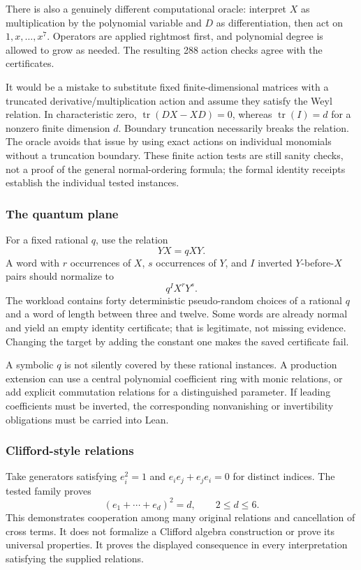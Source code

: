 There is also a genuinely different computational oracle: interpret \(X\) as multiplication by the polynomial variable and \(D\) as differentiation, then act on \(1,x,\ldots,x^7\). Operators are applied rightmost first, and polynomial degree is allowed to grow as needed. The resulting 288 action checks agree with the certificates.

It would be a mistake to substitute fixed finite-dimensional matrices with a truncated derivative/multiplication action and assume they satisfy the Weyl relation. In characteristic zero, \(\operatorname{tr}(DX-XD)=0\), whereas \(\operatorname{tr}(I)=d\) for a nonzero finite dimension \(d\). Boundary truncation necessarily breaks the relation. The oracle avoids that issue by using exact actions on individual monomials without a truncation boundary. These finite action tests are still sanity checks, not a proof of the general normal-ordering formula; the formal identity receipts establish the individual tested instances.

\subsubsection{The quantum plane}
For a fixed rational \(q\), use the relation
\[
 YX=qXY.
\]
A word with \(r\) occurrences of \(X\), \(s\) occurrences of \(Y\), and \(I\) inverted \(Y\)-before-\(X\) pairs should normalize to
\[
 q^I X^rY^s.
\]
The workload contains forty deterministic pseudo-random choices of a rational \(q\) and a word of length between three and twelve. Some words are already normal and yield an empty identity certificate; that is legitimate, not missing evidence. Changing the target by adding the constant one makes the saved certificate fail.

A symbolic \(q\) is not silently covered by these rational instances. A production extension can use a central polynomial coefficient ring with monic relations, or add explicit commutation relations for a distinguished parameter. If leading coefficients must be inverted, the corresponding nonvanishing or invertibility obligations must be carried into Lean.

\subsubsection{Clifford-style relations}
Take generators satisfying \(e_i^2=1\) and \(e_ie_j+e_je_i=0\) for distinct indices. The tested family proves
\[
 (e_1+\cdots+e_d)^2=d,
 \qquad 2\le d\le6.
\]
This demonstrates cooperation among many original relations and cancellation of cross terms. It does not formalize a Clifford algebra construction or prove its universal properties. It proves the displayed consequence in every interpretation satisfying the supplied relations.


